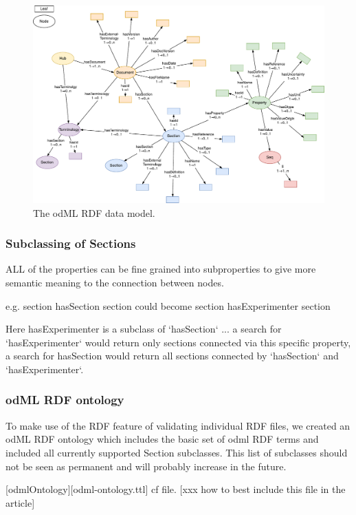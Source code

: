 \documentclass{article}
\begin{document}
\begin{figure}
\begin{center}
\includegraphics[width=0.90\columnwidth]{figures/odmlRDFDataModel.pdf}
\caption{The odML RDF data model.}
\label{fig:rdfModel}
\end{center}
\end{figure}

\subsubsection{Subclassing of Sections}

ALL of the properties can be fine grained into subproperties to give more semantic meaning to the connection between nodes.

e.g.
    section hasSection section
 could become
    section hasExperimenter section

Here hasExperimenter is a subclass of `hasSection` ... a search for `hasExperimenter` would return only sections connected via this specific property, a search for hasSection would return all sections connected by `hasSection` and `hasExperimenter`.

\subsubsection{odML RDF ontology}
To make use of the RDF feature of validating individual RDF files, we created an odML RDF ontology which includes the basic set of odml RDF terms and included all currently supported Section subclasses. This list of subclasses should not be seen as permanent and
will probably increase in the future.

[odmlOntology][odml-ontology.ttl] cf file. [xxx how to best include this file in the article]
\end{document}
